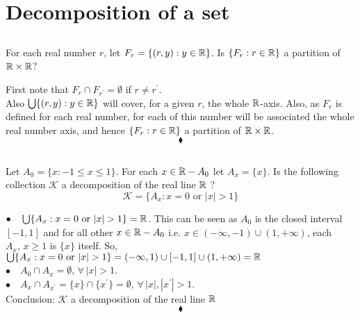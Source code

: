 \newpage

 \section{Decomposition of a set}
\subsection{}
\begin{tcolorbox}
For each real number $r$, let $F_r=\{(r,y):y\in \mathbb{R}\}$. Is $\{F_r:r\in \mathbb{R}\}$ a partition of $\mathbb{R}\times \mathbb{R}$? 
\end{tcolorbox}
$$ $$
First note that $F_r\cap F_{r^{'}}=\emptyset$ if $r\neq r^{'}$.\\
Also $\bigcup\{(r,y):y\in \mathbb{R}\}$ will cover, for a given $r$, the whole $\mathbb{R}$-axis. Also, as $F_r$ is defined for each real number, for each of this number will be associated the whole  real number axis, and hence $\{F_r:r\in \mathbb{R}\}$ a partition of $\mathbb{R}\times \mathbb{R}$.
$$\blacklozenge$$

\subsection{}
\begin{tcolorbox}
Let $A_0= \{ x:-1\leq x\leq 1\}$. For each $x\in \mathbb{R}-A_0$ let $A_x = \{x\}$. Is the following collection $\mathscr{K}$ a decomposition of the real line $\mathbb{R} $ ? 
$$\mathscr{K}= \{A_x:x = 0 \text{ or } |x| > 1\} $$
\end{tcolorbox}
$$ $$
$\bullet\quad \bigcup\{A_x:x = 0 \text{ or } |x| > 1\} =\mathbb{R}$. This can be seen as $A_0$ is the closed interval $[-1,1]$ and for  all other $x\in \mathbb{R}-A_0$ i.e. $x\in (-\infty,-1)\cup (1,+\infty)$, each  $A_x,\, x\geq 1$ is $\{x\}$ itself. So,  $\bigcup\{A_x:x = 0 \text{ or } |x| > 1\} =(-\infty,1) \cup [-1,1]\cup (1,+\infty)=\mathbb{R}$\\
$\bullet\quad A_0\cap A_x=\emptyset,\, \forall\, |x|>1$.\\
$\bullet\quad A_x\cap A_{x^{'}}=\{x\}\cap \{x^{'}\}=\emptyset,\, \forall\, |x|,|x^{'}|>1$.\\
Conclusion: $\mathscr{K}$ a decomposition of the real line $\mathbb{R} $
$$\blacklozenge$$

